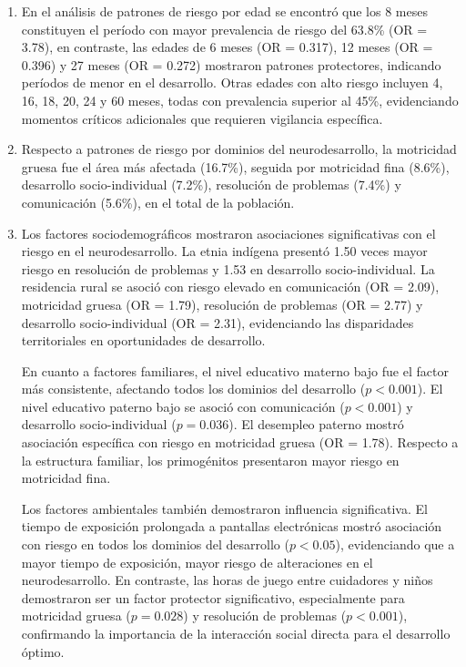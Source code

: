 \documentclass[11pt,letterpaper]{report}
\begin{document}
\begin{enumerate}
\item
En el análisis de patrones de riesgo por edad se encontró que los 8 meses
constituyen el período con mayor prevalencia de riesgo del 63.8\% (OR = 3.78),
en contraste, las edades de 6 meses (OR = 0.317), 12 meses
(OR = 0.396) y 27 meses (OR = 0.272) mostraron patrones protectores,
indicando períodos de menor  en el desarrollo. Otras edades con alto
riesgo incluyen 4, 16, 18, 20, 24 y 60 meses, todas con prevalencia superior
al 45\%, evidenciando momentos críticos adicionales que requieren vigilancia
específica.

\item
Respecto a patrones de riesgo por dominios del neurodesarrollo,
la motricidad gruesa fue el área más afectada (16.7\%), seguida por motricidad
fina (8.6\%), desarrollo socio-individual (7.2\%), resolución de problemas
(7.4\%) y comunicación (5.6\%), en el total de la población.

\item
Los factores sociodemográficos mostraron asociaciones significativas con el
riesgo en el neurodesarrollo. La etnia indígena presentó 1.50 veces mayor
riesgo en resolución de problemas y 1.53 en desarrollo socio-individual. La
residencia rural se asoció con riesgo elevado en comunicación (OR = 2.09),
motricidad gruesa (OR = 1.79), resolución de problemas (OR = 2.77) y
desarrollo socio-individual (OR = 2.31), evidenciando las disparidades
territoriales en oportunidades de desarrollo.

En cuanto a factores familiares, el nivel educativo materno bajo fue el
factor más consistente, afectando todos los dominios del desarrollo
($p < 0.001$). El nivel educativo paterno bajo se asoció con comunicación
($p < 0.001$) y desarrollo socio-individual ($p = 0.036$). El desempleo
paterno mostró asociación específica con riesgo en motricidad gruesa
(OR = 1.78). Respecto a la estructura familiar, los primogénitos presentaron
mayor riesgo en motricidad fina.

Los factores ambientales también demostraron influencia significativa. El
tiempo de exposición prolongada a pantallas electrónicas mostró asociación
con riesgo en todos los dominios del desarrollo ($p < 0.05$), evidenciando
que a mayor tiempo de exposición, mayor riesgo de alteraciones en el
neurodesarrollo. En contraste, las horas de juego entre cuidadores y niños
demostraron ser un factor protector significativo, especialmente para
motricidad gruesa ($p = 0.028$) y resolución de problemas ($p < 0.001$),
confirmando la importancia de la interacción social directa para el
desarrollo óptimo.


\end{enumerate}
\end{document}
